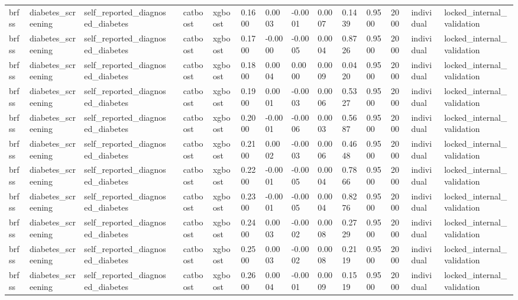 \begin{tabular}{lllllllllllllll}
brfss & diabetes\_screening & self\_reported\_diagnosed\_diabetes &  & catboost & xgboost & 0.1600 & 0.0003 & -0.0001 & 0.0007 & 0.1439 & 0.9500 & 2000 & individual & locked\_internal\_validation \\
brfss & diabetes\_screening & self\_reported\_diagnosed\_diabetes &  & catboost & xgboost & 0.1700 & -0.0000 & -0.0005 & 0.0004 & 0.8726 & 0.9500 & 2000 & individual & locked\_internal\_validation \\
brfss & diabetes\_screening & self\_reported\_diagnosed\_diabetes &  & catboost & xgboost & 0.1800 & 0.0004 & 0.0000 & 0.0009 & 0.0420 & 0.9500 & 2000 & individual & locked\_internal\_validation \\
brfss & diabetes\_screening & self\_reported\_diagnosed\_diabetes &  & catboost & xgboost & 0.1900 & 0.0001 & -0.0003 & 0.0006 & 0.5327 & 0.9500 & 2000 & individual & locked\_internal\_validation \\
brfss & diabetes\_screening & self\_reported\_diagnosed\_diabetes &  & catboost & xgboost & 0.2000 & -0.0001 & -0.0006 & 0.0003 & 0.5687 & 0.9500 & 2000 & individual & locked\_internal\_validation \\
brfss & diabetes\_screening & self\_reported\_diagnosed\_diabetes &  & catboost & xgboost & 0.2100 & 0.0002 & -0.0003 & 0.0006 & 0.4648 & 0.9500 & 2000 & individual & locked\_internal\_validation \\
brfss & diabetes\_screening & self\_reported\_diagnosed\_diabetes &  & catboost & xgboost & 0.2200 & -0.0001 & -0.0005 & 0.0004 & 0.7866 & 0.9500 & 2000 & individual & locked\_internal\_validation \\
brfss & diabetes\_screening & self\_reported\_diagnosed\_diabetes &  & catboost & xgboost & 0.2300 & -0.0001 & -0.0005 & 0.0004 & 0.8276 & 0.9500 & 2000 & individual & locked\_internal\_validation \\
brfss & diabetes\_screening & self\_reported\_diagnosed\_diabetes &  & catboost & xgboost & 0.2400 & 0.0003 & -0.0002 & 0.0008 & 0.2729 & 0.9500 & 2000 & individual & locked\_internal\_validation \\
brfss & diabetes\_screening & self\_reported\_diagnosed\_diabetes &  & catboost & xgboost & 0.2500 & 0.0003 & -0.0002 & 0.0008 & 0.2119 & 0.9500 & 2000 & individual & locked\_internal\_validation \\
brfss & diabetes\_screening & self\_reported\_diagnosed\_diabetes &  & catboost & xgboost & 0.2600 & 0.0004 & -0.0001 & 0.0009 & 0.1519 & 0.9500 & 2000 & individual & locked\_internal\_validation \\

\end{tabular}
